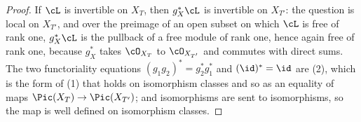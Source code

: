 \begin{proof}
\leanok
If $\cL$ is invertible on $X_T$, then $g_X^*\cL$ is invertible on
$X_{T'}$: the question is local on $X_{T'}$, and over the preimage of an
open subset on which $\cL$ is free of rank one, $g_X^*\cL$ is the
pullback of a free module of rank one, hence again free of rank one,
because $g_X^*$ takes $\cO_{X_T}$ to $\cO_{X_{T'}}$ and commutes with
direct sums.  The two functoriality equations
$(g_1g_2)^*=g_2^*g_1^*$ and $(\id)^*=\id$ are
(2), which is the form of
(1) that holds on isomorphism
classes and so as an equality of maps $\Pic(X_T)\to\Pic(X_{T'})$;
and isomorphisms are sent to isomorphisms, so the map is
well defined on isomorphism classes.
\end{proof}

